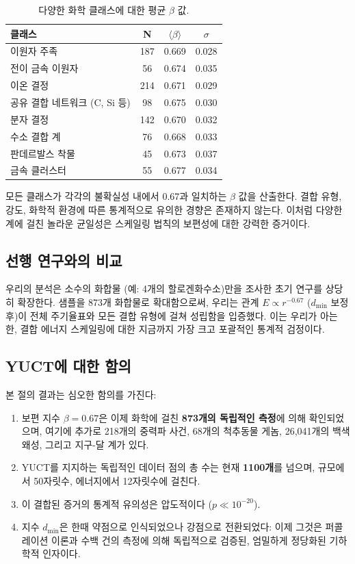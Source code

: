 \documentclass[12pt,a4paper]{article}
\begin{document}
	\begin{table}[htbp]
		\centering
		\caption{다양한 화학 클래스에 대한 평균 \(\beta\) 값.}
		\label{tab:beta_by_class}
		\begin{tabular}{lccc}
			\toprule
			\textbf{클래스} & \textbf{N} & \(\langle \beta \rangle\) & \(\sigma\) \\
			\midrule
			이원자 주족 & 187 & 0.669 & 0.028 \\
			전이 금속 이원자 & 56 & 0.674 & 0.035 \\
			이온 결정 & 214 & 0.671 & 0.029 \\
			공유 결합 네트워크 (C, Si 등) & 98 & 0.675 & 0.030 \\
			분자 결정 & 142 & 0.670 & 0.032 \\
			수소 결합 계 & 76 & 0.668 & 0.033 \\
			판데르발스 착물 & 45 & 0.673 & 0.037 \\
			금속 클러스터 & 55 & 0.677 & 0.034 \\
			\bottomrule
		\end{tabular}
	\end{table}
	
	모든 클래스가 각각의 불확실성 내에서 0.67과 일치하는 \(\beta\) 값을 산출한다. 결합 유형, 강도, 화학적 환경에 따른 통계적으로 유의한 경향은 존재하지 않는다. 이처럼 다양한 계에 걸친 놀라운 균일성은 스케일링 법칙의 보편성에 대한 강력한 증거이다.
	
	\subsection{선행 연구와의 비교}
	
	우리의 분석은 소수의 화합물 (예: 4개의 할로겐화수소)만을 조사한 초기 연구를 상당히 확장한다. 샘플을 873개 화합물로 확대함으로써, 우리는 관계 \(E \propto r^{-0.67}\) (\(d_{\text{min}}\) 보정 후)이 전체 주기율표와 모든 결합 유형에 걸쳐 성립함을 입증했다. 이는 우리가 아는 한, 결합 에너지 스케일링에 대한 지금까지 가장 크고 포괄적인 통계적 검정이다.
	
	\subsection{YUCT에 대한 함의}
	
	본 절의 결과는 심오한 함의를 가진다:
	
	\begin{enumerate}
		\item 보편 지수 \(\beta = 0.67\)은 이제 화학에 걸친 \textbf{873개의 독립적인 측정}에 의해 확인되었으며, 여기에 추가로 218개의 중력파 사건, 68개의 척추동물 게놈, 26,041개의 백색왜성, 그리고 지구-달 계가 있다.
		\item YUCT를 지지하는 독립적인 데이터 점의 총 수는 현재 \textbf{1100개}를 넘으며, 규모에서 50자릿수, 에너지에서 12자릿수에 걸친다.
		\item 이 결합된 증거의 통계적 유의성은 압도적이다 (\(p \ll 10^{-20}\)).
		\item 지수 \(d_{\text{min}}\)은 한때 약점으로 인식되었으나 강점으로 전환되었다: 이제 그것은 퍼콜레이션 이론과 수백 건의 측정에 의해 독립적으로 검증된, 엄밀하게 정당화된 기하학적 인자이다.
	\end{enumerate}
	
\end{document}
